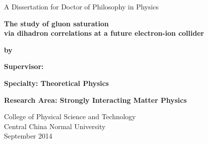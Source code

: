 \mbox{}\vskip 0.8cm
\begin{center}
{\Large A Dissertation for Doctor of Philosophy in Physics}
\end{center}
\vspace{0.22in}
\begin{center} {\LARGE \textbf{The study of gluon saturation \\ via dihadron correlations at a future electron-ion collider}}
\end{center}
\vspace{0.22in}

\begin{center}
\bfseries{
{\Large  by \\   \vskip 0.22in  \vskip 0.4in }
}
\end{center}




\mbox{}\hskip 0.7cm{\Large { \bfseries Supervisor:  %
} }

\mbox{}\hskip 0.7cm{\Large { \bfseries Specialty:  Theoretical Physics} }

\mbox{}\hskip 0.7cm{\Large { \bfseries Research Area: Strongly Interacting Matter Physics} }

\vskip 1.55in


\begin{center}
{\Large
College of Physical Science and Technology \\
Central \hskip 0.2cm China \hskip 0.2cm Normal \hskip 0.2cm University \\ 
\vskip 0.22cm September \hskip 0.2cm 2014 }
\end{center}

\clearpage
